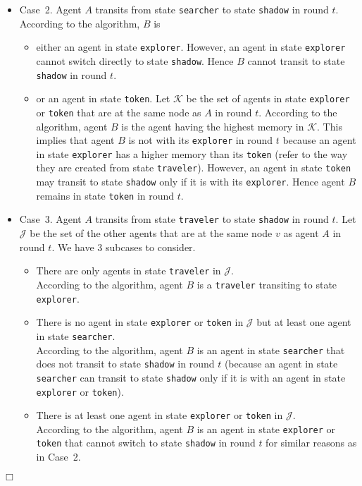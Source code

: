 \documentclass[11pt]{article}
\newcommand{\qed}{\hfill $\Box$ \bigbreak}
\newenvironment{proof}{\noindent {\bf Proof.}}{\qed}
\begin{document}
\begin{proof}
\begin{itemize}
\item{ {Case~2.} Agent $A$ transits from state {\tt searcher} to state {\tt shadow} in round $t$. According to the algorithm, $B$ is }
\begin{itemize}
\item{ either an agent in state {\tt explorer}. However, an agent in state {\tt explorer} cannot switch directly to state {\tt shadow}. Hence $B$ cannot transit to
state {\tt shadow} in round $t$. }
\item{ or an agent in state {\tt token}. Let $\mathcal{K}$ be the set of agents in state {\tt explorer} or {\tt token} that are at the same node as $A$ in round $t$. According to the algorithm, agent $B$ is the agent having the highest memory in $\mathcal{K}$. This implies that agent $B$ is not with its {\tt explorer} in round $t$ because an agent in state {\tt explorer} has a higher memory than its {\tt token} (refer to the way they are created from state {\tt traveler}). However, an agent in state {\tt token} may transit to state {\tt shadow} only if it is with its {\tt explorer}. Hence agent $B$ remains in state {\tt token} in round $t$.}
\end{itemize}
\item{ {Case~3.} Agent $A$ transits from state {\tt traveler} to state {\tt shadow} in round $t$. Let $\mathcal{J}$ be the set of the other agents that are at the same node $v$ as agent $A$ in round $t$. We have $3$ subcases to consider.}
\begin{itemize}

\item{  There are only agents in state {\tt traveler} in $\mathcal{J}$.\\ According to the algorithm, agent $B$ is a {\tt traveler} transiting to state {\tt explorer}.}

\item{  There is no agent in state {\tt explorer} or {\tt token} in $\mathcal{J}$ but at least one agent in state {\tt searcher}.\\ According to the algorithm, agent $B$ is an agent in state {\tt searcher} that does not transit to state {\tt shadow} in round $t$ (because an agent in state {\tt searcher} can transit to state {\tt shadow} only if it is with an agent in state {\tt explorer} or {\tt token}).}

\item{  There is at least one agent in state {\tt explorer} or {\tt token} in $\mathcal{J}$.\\ According to the algorithm, agent $B$ is an agent in state {\tt explorer} or {\tt token} that cannot switch to state {\tt shadow} in round $t$ for similar reasons as in Case~2. }


\end{itemize}
\end{itemize}
\end{proof}
\end{document}
